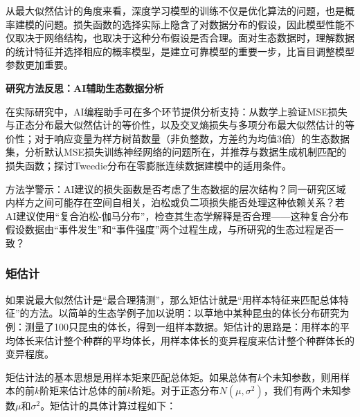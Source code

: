 \documentclass[
  twoside,12pt,fontset=none]{ctexbook}
\renewenvironment{quote}{%
  \def\FrameCommand{{\color{quote-border}\vrule width 4pt}\hspace{10pt}}%
  \MakeFramed {\advance\hsize-\width \FrameRestore\noindent\ignorespaces}%
}{%
  \endMakeFramed
}
\begin{document}
从最大似然估计的角度来看，深度学习模型的训练不仅是优化算法的问题，也是概率建模的问题。损失函数的选择实际上隐含了对数据分布的假设，因此模型性能不仅取决于网络结构，也取决于这种分布假设是否合理。面对生态数据时，理解数据的统计特征并选择相应的概率模型，是建立可靠模型的重要一步，比盲目调整模型参数更加重要。

\begin{quote}
\textbf{研究方法反思：AI辅助生态数据分析}

在实际研究中，AI编程助手可在多个环节提供分析支持：从数学上验证MSE损失与正态分布最大似然估计的等价性，以及交叉熵损失与多项分布最大似然估计的等价性；对于响应变量为样方树苗数量（非负整数，方差约为均值3倍）的生态数据集，分析默认MSE损失训练神经网络的问题所在，并推荐与数据生成机制匹配的损失函数；探讨Tweedie分布在零膨胀连续数据建模中的适用条件。

方法学警示：AI建议的损失函数是否考虑了生态数据的层次结构？同一研究区域内样方之间可能存在空间自相关，泊松或负二项损失能否处理这种依赖关系？若AI建议使用``复合泊松-伽马分布''，检查其生态学解释是否合理------这种复合分布假设数据由``事件发生''和``事件强度''两个过程生成，与所研究的生态过程是否一致？
\end{quote}

\hypertarget{ux77e9ux4f30ux8ba1}{%
\subsubsection{矩估计}\label{ux77e9ux4f30ux8ba1}}

如果说最大似然估计是``最合理猜测''，那么矩估计就是``用样本特征来匹配总体特征''的方法。以简单的生态学例子加以说明：以草地中某种昆虫的体长分布研究为例：测量了100只昆虫的体长，得到一组样本数据。矩估计的思路是：用样本的平均体长来估计整个种群的平均体长，用样本体长的变异程度来估计整个种群体长的变异程度。

矩估计法的基本思想是用样本矩来匹配总体矩。如果总体有\(k\)个未知参数，则用样本的前\(k\)阶矩来估计总体的前\(k\)阶矩。对于正态分布\(N(\mu, \sigma^2)\)，我们有两个未知参数\(\mu\)和\(\sigma^2\)。矩估计的具体计算过程如下：
\end{document}
